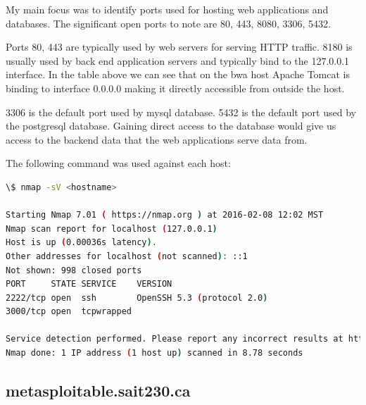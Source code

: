 \documentclass{article}
\begin{document}

My main focus was to identify ports used for hosting web applications and databases. 
The significant open ports to note are 80, 443, 8080, 3306, 5432.

Ports 80, 443 are typically used by web servers for serving HTTP traffic.
8180 is usually used by back end application servers and typically bind to the 127.0.0.1
interface. In the table above we can see that on the bwa host Apache Tomcat is binding 
to interface 0.0.0.0 making it directly accessible from outside the host.

3306 is the default port used by mysql database.
5432 is the default port used by the postgresql database.
Gaining direct access to the database would give us access to the backend data
that the web applications serve data from.

\noindent The following command was used against each host:
\begin{lstlisting}[language=bash, firstline=1, lastline=3]
\$ nmap -sV <hostname>

Starting Nmap 7.01 ( https://nmap.org ) at 2016-02-08 12:02 MST
Nmap scan report for localhost (127.0.0.1)
Host is up (0.00036s latency).
Other addresses for localhost (not scanned): ::1
Not shown: 998 closed ports
PORT     STATE SERVICE    VERSION
2222/tcp open  ssh        OpenSSH 5.3 (protocol 2.0)
3000/tcp open  tcpwrapped

Service detection performed. Please report any incorrect results at https://nmap.org/submit/ .
Nmap done: 1 IP address (1 host up) scanned in 8.78 seconds
\end{lstlisting}

\subsection{metasploitable.sait230.ca}
\end{document}
